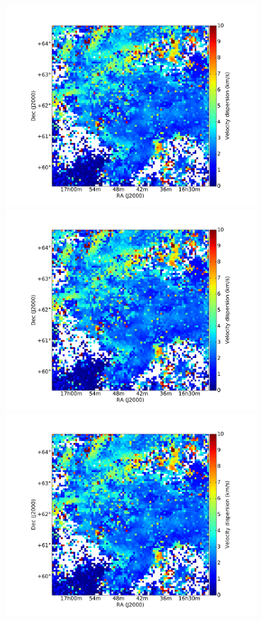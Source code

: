 \documentclass[traditabstract]{aa}
\begin{document}
   \centering
   \includegraphics[page=1,height=7.5cm,trim=110 35 105 75,clip=true]{Figures/Phases_GHIGLS/GHIGLS_disp.pdf}
   \hspace{5mm}
   \includegraphics[page=4,height=7.5cm,trim=110 35 105 75,clip=true]{Figures/Phases_GHIGLS/GHIGLS_disp.pdf} \\
   \vspace{5mm}
   \includegraphics[page=2,height=7.5cm,trim=110 35 105 75,clip=true]{Figures/Phases_GHIGLS/GHIGLS_disp.pdf}
\end{document}
